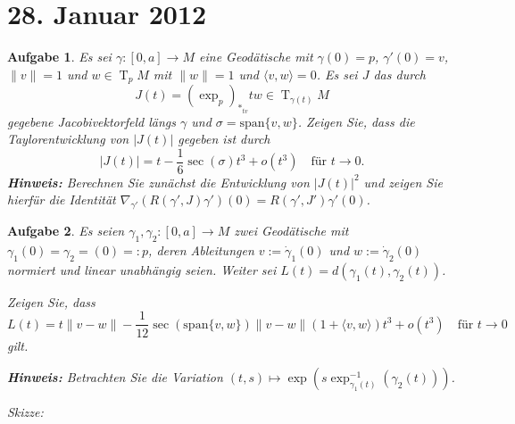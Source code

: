 \documentclass[paper=A4, twoside, chapterprefix=true, bibliography=totoc, headsepline]{scrbook}
\newcommand{\tikzgitter}[3][0.25]{
	\draw[step=#1,gray!15] #2 grid #3;
	\draw[step=2*#1,gray!30] #2 grid #3;
	\fill (0,0) circle(0.1); 
}
\DeclareMathOperator{\T}{T}         %
\theoremstyle{plain}
\theoremstyle{nonumberplain}
\theoremstyle{empty}
\theoremstyle{break}
\newtheorem{Aufg}{Aufgabe}
\begin{document}

\section{28. Januar 2012}
\setcounter{Aufg}{0} %
\setcounter{Loes}{0}

\begin{Aufg}
Es sei $\gamma:[0,a]\to M$ eine Geodätische mit $\gamma(0)=p$, $\gamma'(0)=v$, $\|v\|=1$ und $w\in \T_pM$ mit $\|w\|=1$ und $\langle v,w\rangle=0$.  Es sei $J$ das durch 
	\[J(t)=(\exp_p)_{*_{tv}}tw \in \T_{\gamma(t)}M\]
gegebene Jacobivektorfeld längs $\gamma$ und $\sigma=\mathrm{span}\{v,w\}$. Zeigen Sie, dass die Taylorentwicklung von $|J(t)|$ gegeben ist durch
	\[|J(t)|=t-\frac{1}{6}\sec(\sigma)t^3+o(t^3) \quad \text{für }t\to0.\]
{\footnotesize \textbf{Hinweis:} Berechnen Sie zunächst die Entwicklung von $|J(t)|^2$ und zeigen Sie hierfür die Identität $\nabla_{\gamma'}(R(\gamma',J)\gamma')(0)=R(\gamma',J')\gamma'(0)$.}
\end{Aufg}

\begin{Aufg}
Es seien $\gamma_1, \gamma_2:[0,a] \to M$ zwei Geodätische mit $\gamma_1(0)=\gamma_2=(0)=:p$, deren Ableitungen $v:=\dot{\gamma}_1(0)$ und $w:=\dot{\gamma}_2(0)$ normiert und linear unabhängig seien. Weiter sei $L(t)=d(\gamma_1(t), \gamma_2(t))$.

Zeigen Sie, dass
	\[L(t)=t\|v-w\|-\frac{1}{12}\sec(\mathrm{span}\{v,w\})\|v-w\|(1+\langle v,w\rangle)t^3 + o(t^3)\quad \text{für }t\to 0\]gilt.

{\footnotesize \textbf{Hinweis:} Betrachten Sie die Variation $(t,s)\mapsto\exp(s\exp^{-1}_{\gamma_1(t)}(\gamma_2(t)))$.}

Skizze:
\begin{center}\end{center}
\end{Aufg}
\end{document}
